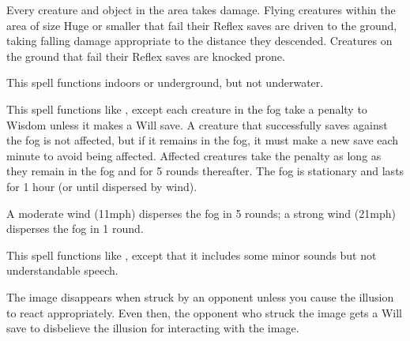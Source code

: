\spellrng{\rngfar}
\begin{spelleffect}
  Every creature and object in the area takes damage. Flying creatures within the area of size Huge or smaller that fail their Reflex saves are driven to the ground, taking falling damage appropriate to the distance they descended. Creatures on the ground that fail their Reflex saves are knocked prone.
\end{spelleffect}
\begin{spellnotes}
  This spell functions indoors or underground, but not underwater.
\end{spellnotes}

\spellrng{\rngclose}
\begin{spelleffect}
  This spell functions like , except each creature in the fog take a  penalty to Wisdom unless it makes a Will save. A creature that successfully saves against the fog is not affected, but if it remains in the fog, it must make a new save each minute to avoid being affected. Affected creatures take the penalty as long as they remain in the fog and for 5 rounds thereafter. The fog is stationary and lasts for 1 hour (or until dispersed by wind).
\end{spelleffect}
\begin{spellnotes}
  A moderate wind (11\add mph) disperses the fog in 5 rounds; a strong wind (21\add mph) disperses the fog in 1 round.
\end{spellnotes}

\spellrng{\rngmed}
\spelldur{\durshort}
\begin{spelleffect}
  This spell functions like , except that it includes some minor sounds but not understandable speech.
\end{spelleffect}
\begin{spellnotes}
  The image disappears when struck by an opponent unless you cause the illusion to react appropriately. Even then, the opponent who struck the image gets a Will save to disbelieve the illusion for interacting with the image.
\end{spellnotes}

